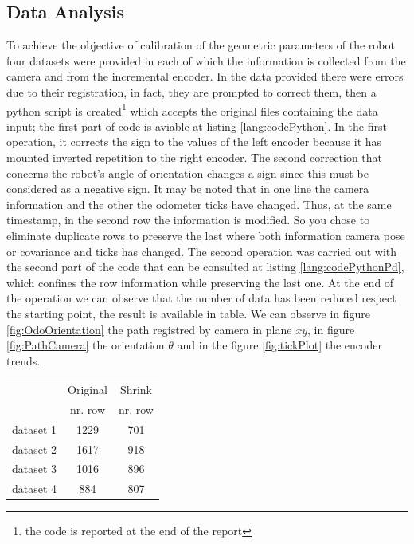 \subsection{Data Analysis}
To achieve the objective of calibration of the geometric parameters of the robot four datasets were provided in each of which the information is collected from the camera and from the incremental encoder.
In the data provided there were errors due to their registration, in fact, they are prompted to correct them, then a python script is created\footnote{the code is reported at the end of the report} which accepts the original files containing the data input; the first part of code is aviable at listing \ref{lang:codePython}.
In the first operation, it corrects the sign to the values of the left encoder because it has mounted inverted repetition to the right encoder.
The second correction that concerns the robot's angle of orientation changes a sign since this must be considered as a negative sign.
It may be noted that in one line the camera information and the other the odometer ticks have changed. 
Thus, at the same timestamp, in the second row the information is modified.
So you chose to eliminate duplicate rows to preserve the last where both information camera pose or covariance and ticks has changed.
The second operation was carried out with the second part of the code that can be consulted at listing \ref{lang:codePythonPd}, which confines the row information while preserving the last one.
At the end of the operation we can observe that the number of data has been reduced respect the starting point, the result is available in table.
We can observe in figure \ref{fig:OdoOrientation} the path registred by camera in plane $xy$, in figure \ref{fig:PathCamera} the orientation $\theta$ and in the figure \ref{fig:tickPlot} the encoder trends.
\begin{table}[!htb]
\centering
\begin{tabular}{lcc}
\hline
			&	Original		&	Shrink\\
			&	nr. row		&	nr. row\\
\hline
dataset 1	&	1229			& 	701\\
dataset 2	&	1617			& 	918\\
dataset 3	&	1016			& 	896\\
dataset 4	&	884			& 	807\\
\hline
\end{tabular}
\end{table}

